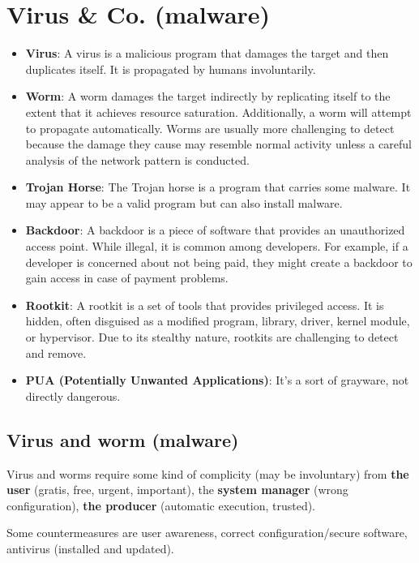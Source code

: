 \section{Virus \& Co. (malware)}
\begin{itemize}
  \item \textbf{Virus}:
        A virus is a malicious program that damages the target and then duplicates itself. It is propagated by humans involuntarily.
  \item \textbf{Worm}:
        A worm damages the target indirectly by replicating itself to the extent that it achieves resource saturation. Additionally, a worm will attempt to propagate automatically. Worms are usually more challenging to detect because the damage they cause may resemble normal activity unless a careful analysis of the network pattern is conducted.
  \item \textbf{Trojan Horse}:
        The Trojan horse is a program that carries some malware. It may appear to be a valid program but can also install malware.
  \item \textbf{Backdoor}:
        A backdoor is a piece of software that provides an unauthorized access point. While illegal, it is common among developers. For example, if a developer is concerned about not being paid, they might create a backdoor to gain access in case of payment problems.
  \item \textbf{Rootkit}:
        A rootkit is a set of tools that provides privileged access. It is hidden, often disguised as a modified program, library, driver, kernel module, or hypervisor. Due to its stealthy nature, rootkits are challenging to detect and remove.
  \item \textbf{PUA (Potentially Unwanted Applications)}:
        It's a sort of grayware, not directly dangerous.
\end{itemize}


\subsection{Virus and worm (malware)}
Virus and worms require some kind of complicity (may be involuntary) from \textbf{the user} (gratis, free, urgent,
important), the \textbf{system manager} (wrong configuration), \textbf{the producer} (automatic execution, trusted).

Some countermeasures are user awareness, correct configuration/secure software, antivirus (installed and updated).


